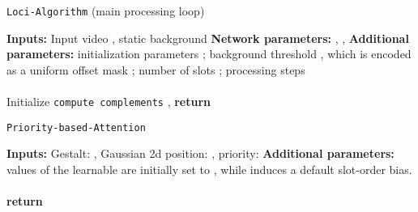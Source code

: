 \documentclass{article} \usepackage{iclr2023_conference_arxiv,times}
\begin{document}
\begin{algorithm}[b!]
   \caption{\texttt{Loci-Algorithm} (main processing loop)}
   \label{algo:loci}
\begin{algorithmic}[1]
    \vspace{.1cm}
    \STATE \textbf{Inputs:} Input video , static background 
    \STATE \textbf{Network parameters:} , , 
    \STATE \textbf{Additional parameters:}
    initialization parameters ; background threshold , which is encoded as a uniform offset mask ; number of slots ; processing steps 
    \\\vspace{-.1cm}
    \hrulefill
    \\\vspace{.1cm}
    \STATE  Initialize  
    \vspace{-.3cm}
    \FOR{}
            \vspace{.1cm}
        \STATE {}
\STATE 
        \STATE \texttt{compute complements} , 
            \vspace{.1cm}
        \STATE {}
\STATE 
\STATE 
\STATE 
            \STATE 
\vspace{.1cm}
        \STATE {}
\STATE  
            \vspace{.1cm}
        \STATE {}
        \STATE  
        \STATE 
            \vspace{.1cm}
        \STATE{}
\STATE {}
\STATE  
            \vspace{-.2cm}
            \STATE 
            \STATE 
                \vspace{.1cm}
            \STATE {}
\STATE 
            \STATE 
    \ENDFOR
\STATE \textbf{return} 
\end{algorithmic}
\end{algorithm}
\begin{algorithm}[t!]
   \caption{\texttt{Priority-based-Attention}}
   \label{algo:atten}
\begin{algorithmic}[1]
    \vspace{.1cm}
    \STATE \textbf{Inputs:} 
    Gestalt: , 
    Gaussian 2d position: ,
    priority: 
    \STATE \textbf{Additional parameters:} values of the learnable  are initially set to , while   induces a default slot-order bias.
    \\\vspace{-.1cm}
    \hrulefill
    \\\vspace{.1cm}
    \STATE  {}
    \STATE {}
    \STATE  
    \STATE  \COMMENT{}
    \STATE \textbf{return} 
\end{algorithmic}
\end{algorithm}
\end{document}
